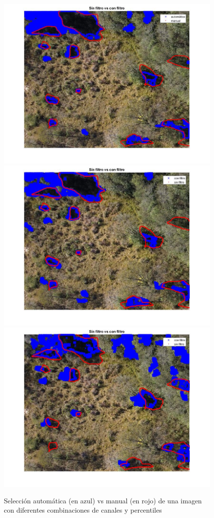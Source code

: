 \begin{figure}
    \\[\smallskipamount]
    \includegraphics[width=.3\textwidth]{Imagenes/IIC/p90/BR/230a.jpg}\hfill
    \includegraphics[width=.3\textwidth]{Imagenes/IIC/p90/BG/230a.jpg}\hfill
    \includegraphics[width=.3\textwidth]{Imagenes/IIC/p90/GR/230a.jpg}\hfill
    
    \caption{Selección automática (en azul) vs manual (en rojo) de una imagen con diferentes combinaciones de canales y percentiles}\label{fig:dji180}
\end{figure}\label{dji230}

